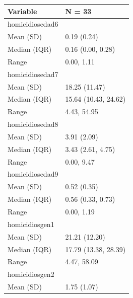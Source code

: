 \begin{table}
\centering\begingroup\fontsize{7}{9}\selectfont

\begin{tabular}{ll}
\toprule
Variable & N = 33\\
\midrule
homicidiosedad6 & \\
\hspace{1em}Mean (SD) & 0.19 (0.24)\\
\hspace{1em}Median (IQR) & 0.16 (0.00, 0.28)\\
\hspace{1em}Range & 0.00, 1.11\\
homicidiosedad7 & \\
\addlinespace
\hspace{1em}Mean (SD) & 18.25 (11.47)\\
\hspace{1em}Median (IQR) & 15.64 (10.43, 24.62)\\
\hspace{1em}Range & 4.43, 54.95\\
homicidiosedad8 & \\
\hspace{1em}Mean (SD) & 3.91 (2.09)\\
\addlinespace
\hspace{1em}Median (IQR) & 3.43 (2.61, 4.75)\\
\hspace{1em}Range & 0.00, 9.47\\
homicidiosedad9 & \\
\hspace{1em}Mean (SD) & 0.52 (0.35)\\
\hspace{1em}Median (IQR) & 0.56 (0.33, 0.73)\\
\addlinespace
\hspace{1em}Range & 0.00, 1.19\\
homicidiosgen1 & \\
\hspace{1em}Mean (SD) & 21.21 (12.20)\\
\hspace{1em}Median (IQR) & 17.79 (13.38, 28.39)\\
\hspace{1em}Range & 4.47, 58.09\\
\addlinespace
homicidiosgen2 & \\
\hspace{1em}Mean (SD) & 1.75 (1.07)\\

\end{tabular}
\end{table}
